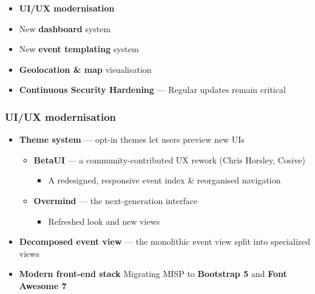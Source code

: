 \begin{frame}
\begin{center}
\begin{tikzpicture}
    \end{tikzpicture}
    \end{center}


    \begin{itemize}
        \item {\bf UI/UX modernisation}
        \item New {\bf dashboard} system
        \item New {\bf event templating} system
        \item {\bf Geolocation \& map} visualisation
        \item \textbf{Continuous Security Hardening} --- \alert{Regular updates remain critical}
    \end{itemize}

\end{frame}


\begin{frame}
    \frametitle{UI/UX modernisation}

    \vspace{-4em}
    \vspace{-0.3em}

    \begin{itemize}
        \item {\bf Theme system} --- opt-in themes let users preview new UIs
        \begin{itemize}
            \item {\bf BetaUI} --- a community-contributed UX rework (Chris Horsley, Cosive)
                \begin{itemize}
                    \item[] A redesigned, responsive event index \& reorganised navigation
                \end{itemize}
            \item {\bf Overmind} --- the next-generation interface
                \begin{itemize}
                    \item[] Refreshed look and new views
                \end{itemize}
        \end{itemize}
        \item {\bf Decomposed event view} --- the monolithic event view split into specialized views
        \item {\bf Modern front-end stack} Migrating MISP to {\bf Bootstrap 5} and {\bf Font Awesome 7}
    \end{itemize}

\end{frame}

